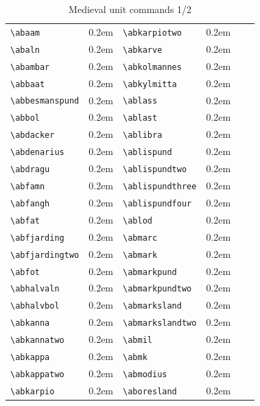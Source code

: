 \documentclass[a4paper]{article}
\newcommand{\samplefont}{\fontsize{16}{16}\abcursivefamily\spaceskip0.2em}
\newcommand{\sample}[1]{{\samplefont #1 \strut}}
\newcommand{\ltxncmd}[1]{\texttt{\textbackslash{}#1}}
\begin{document}
\begin{table}
  \begin{tabular}{llllll}
\ltxncmd{abaam} & \sample{\abaam} & \ltxncmd{abkarpiotwo} & \sample{\abkarpiotwo} \\
\ltxncmd{abaln} & \sample{\abaln} & \ltxncmd{abkarve} & \sample{\abkarve} \\
\ltxncmd{abambar} & \sample{\abambar} & \ltxncmd{abkolmannes} & \sample{\abkolmannes} \\
\ltxncmd{abbaat} & \sample{\abbaat} & \ltxncmd{abkylmitta} & \sample{\abkylmitta} \\
\ltxncmd{abbesmanspund} & \sample{\abbesmanspund} & \ltxncmd{ablass} & \sample{\ablass} \\
\ltxncmd{abbol} & \sample{\abbol} & \ltxncmd{ablast} & \sample{\ablast} \\
\ltxncmd{abdacker} & \sample{\abdacker} & \ltxncmd{ablibra} & \sample{\ablibra} \\
\ltxncmd{abdenarius} & \sample{\abdenarius} & \ltxncmd{ablispund} & \sample{\ablispund} \\
\ltxncmd{abdragu} & \sample{\abdragu} & \ltxncmd{ablispundtwo} & \sample{\ablispundtwo} \\
\ltxncmd{abfamn} & \sample{\abfamn} & \ltxncmd{ablispundthree} & \sample{\ablispundthree} \\
\ltxncmd{abfangh} & \sample{\abfangh} & \ltxncmd{ablispundfour} & \sample{\ablispundfour} \\
\ltxncmd{abfat} & \sample{\abfat} & \ltxncmd{ablod} & \sample{\ablod} \\
\ltxncmd{abfjarding} & \sample{\abfjarding} & \ltxncmd{abmarc} & \sample{\abmarc} \\
\ltxncmd{abfjardingtwo} & \sample{\abfjardingtwo} & \ltxncmd{abmark} & \sample{\abmark} \\
\ltxncmd{abfot} & \sample{\abfot} & \ltxncmd{abmarkpund} & \sample{\abmarkpund} \\
\ltxncmd{abhalvaln} & \sample{\abhalvaln} & \ltxncmd{abmarkpundtwo} & \sample{\abmarkpundtwo} \\
\ltxncmd{abhalvbol} & \sample{\abhalvbol} & \ltxncmd{abmarksland} & \sample{\abmarksland} \\
\ltxncmd{abkanna} & \sample{\abkanna} & \ltxncmd{abmarkslandtwo} & \sample{\abmarkslandtwo} \\
\ltxncmd{abkannatwo} & \sample{\abkannatwo} & \ltxncmd{abmil} & \sample{\abmil} \\
\ltxncmd{abkappa} & \sample{\abkappa} & \ltxncmd{abmk} & \sample{\abmk} \\
\ltxncmd{abkappatwo} & \sample{\abkappatwo} & \ltxncmd{abmodius} & \sample{\abmodius} \\
\ltxncmd{abkarpio} & \sample{\abkarpio} & \ltxncmd{aboresland} & \sample{\aboresland} \\
  \end{tabular}
  \caption{Medieval unit commands 1/2}
  \label{tab:abbreviation_commands_1}
\end{table}
\end{document}
